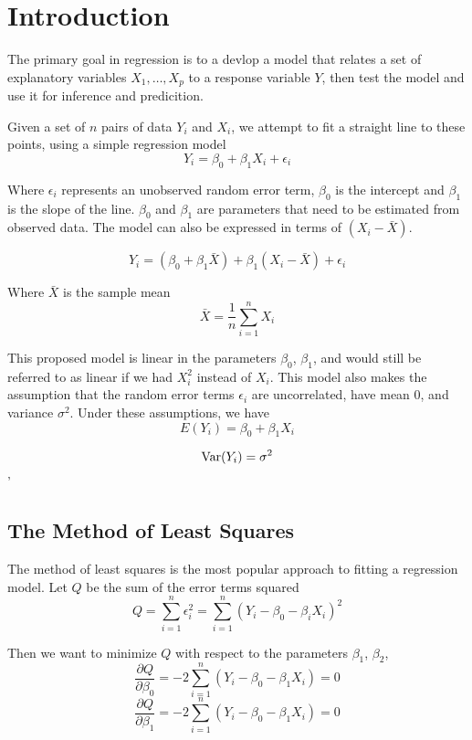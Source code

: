 \chapter{Introduction} 

The primary goal in regression is to a devlop a model that relates a set of explanatory variables $X_1, \ldots, X_p$ to a response variable $Y$, then test the model and use it for inference and predicition. 

Given a set of $n$ pairs of data $Y_i$ and $X_i$, we attempt to fit a straight line to these points, using a simple regression model 
\[Y_i = \beta_0 + \beta_1X_i + \epsilon_i\]

Where $\epsilon_i$ represents an unobserved random error term, $\beta_0$ is the intercept and $\beta_1$ is the slope of the line. $\beta_0$ and $\beta_1$ are parameters that need to be estimated from observed data. The model can also be expressed in terms of $(X_i - \bar{X})$.

\[Y_i = (\beta_0 + \beta_1\bar{X}) + \beta_1(X_i - \bar{X}) + \epsilon_i\]

Where $\bar{X}$ is the sample mean 
\[\bar{X} = \frac{1}{n}\sum_{i=1}^n  X_i \]

This proposed model is linear in the parameters $\beta_0$, $\beta_1$, and would still be referred to as linear if we had $X_i^2$ instead of $X_i$. This model also makes the assumption that the random error terms $\epsilon_i$ are uncorrelated, have mean 0, and variance $\sigma^2$. Under these assumptions, we have 
\[E(Y_i) = \beta_0 + \beta_1 X_i\]

\[\operatorname{Var}(Y_i) = \sigma^2\]'

\section{The Method of Least Squares}

The method of least squares is the most popular approach to fitting a regression model. Let $Q$ be the sum of the error terms squared 
\[Q = \sum_{i=1}^n \epsilon_i^2 = \sum_{i=1}^n (Y_i - \beta_0 - \beta_iX_i)^2\]

Then we want to minimize $Q$ with respect to the parameters $\beta_1$, $\beta_2$, 
\[\frac{\partial Q}{\partial \beta_0} = -2\sum_{i=1}^n (Y_i - \beta_0 - \beta_1X_i) = 0\]
\[\frac{\partial Q}{\partial \beta_1} = -2\sum_{i=1}^n (Y_i - \beta_0 - \beta_1X_i) = 0\]

